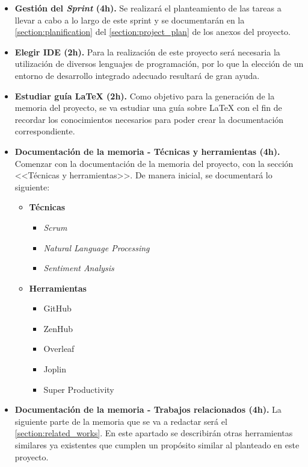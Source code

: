 \begin{itemize}
    \item \textbf{Gestión del \textit{Sprint} (4h).}  Se realizará el planteamiento de las tareas a llevar a cabo a lo largo de este sprint y se documentarán en la \autoref{section:planification} del \autoref{section:project_plan} de los anexos del proyecto.

    \item \textbf{Elegir IDE (2h).} Para la realización de este proyecto será necesaria la utilización de diversos lenguajes de programación, por lo que la elección de un entorno de desarrollo integrado adecuado resultará de gran ayuda.

    \item \textbf{Estudiar guía \LaTeX{} (2h).} Como objetivo para la generación de la memoria del proyecto, se va estudiar una guía sobre \LaTeX{} con el fin de recordar los conocimientos necesarios para poder crear la documentación correspondiente.
 
    \item \textbf{Documentación de la memoria - Técnicas y herramientas (4h).} Comenzar con la documentación de la memoria del proyecto, con la sección <<Técnicas y herramientas>>. De manera inicial, se documentará lo siguiente:

    \begin{itemize}
        \item \textbf{Técnicas}
        \begin{itemize}
            \item \textit{Scrum}
            \item \textit{Natural Language Processing}
            \item \textit{Sentiment Analysis}
        \end{itemize}
        \item \textbf{Herramientas}
        \begin{itemize}
            \item GitHub
            \item ZenHub
            \item Overleaf
            \item Joplin
            \item Super Productivity
        \end{itemize}
    \end{itemize}
    
    \item \textbf{Documentación de la memoria - Trabajos relacionados (4h).} La siguiente parte de la memoria que se va a redactar será el \autoref{section:related_works}. En este apartado se describirán otras herramientas similares ya existentes que cumplen un propósito similar al planteado en este proyecto.
    

\end{itemize}

